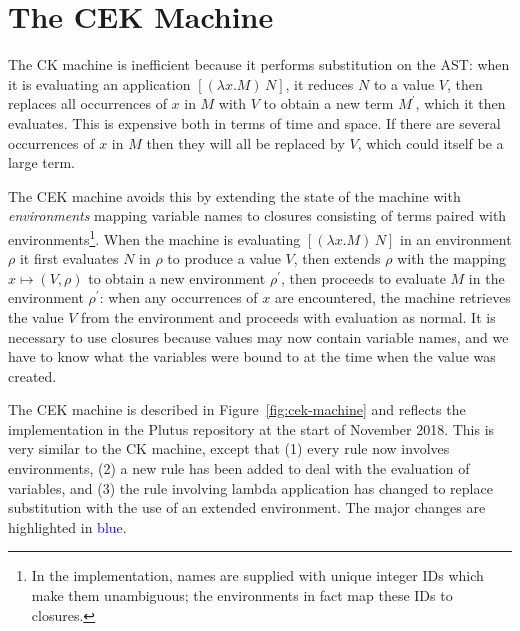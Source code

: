 \documentclass[a4paper]{article}
\newcommand\blue[1]{\textcolor{blue}{#1}}
\begin{document}

\newpage



\newpage


\section{The CEK Machine}
The CK machine is inefficient because it performs substitution on the
AST: when it is evaluating an application $[(\lambda x.M)\, N]$, it
reduces $N$ to a value $V$, then replaces all occurrences of $x$ in
$M$ with $V$ to obtain a new term $M^\prime$, which it then evaluates.
This is expensive both in terms of time and space.  If there are
several occurrences of $x$ in $M$ then they will all be replaced by
$V$, which could itself be a large term.

The CEK machine avoids this by extending the state of the machine with
\textit{environments} mapping variable names to closures consisting of
terms paired with environments\footnote{In the implementation, names
  are supplied with unique integer IDs which make them unambiguous;
  the environments in fact map these IDs to closures.}.  When the
machine is evaluating $[(\lambda x.M)\, N]$ in an environment $\rho$ it
first evaluates $N$ in $\rho$ to produce a value $V$, then extends
$\rho$ with the mapping $x \mapsto (V,\rho)$ to obtain a new
environment $\rho^{\prime}$, then proceeds to evaluate $M$ in the
environment $\rho^\prime$: when any occurrences of $x$ are encountered,
the machine retrieves the value $V$ from the environment and proceeds
with evaluation as normal.  It is necessary to use closures because
values may now contain variable names, and we have to know what the
variables were bound to at the time when the value was created.


The CEK machine is described in Figure~\ref{fig:cek-machine} and
reflects the implementation in the Plutus repository at the start of
November 2018.  This is very similar to the CK machine, except that
(1) every rule now involves environments, (2) a new rule has been
added to deal with the evaluation of variables, and (3) the rule
involving lambda application has changed to replace substitution with
the use of an extended environment. The major changes are
highlighted in \blue{blue}.
\end{document}
